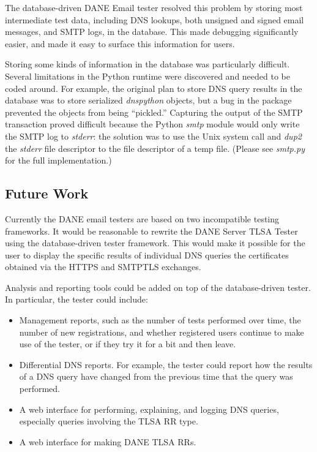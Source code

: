 \documentclass[preprint,3p,11pt]{elsarticle}
\begin{document}
The database-driven DANE Email tester resolved this problem by storing
most intermediate test data, including DNS lookups, both unsigned and
signed email messages, and SMTP logs, in the database. This made
debugging significantly easier, and made it easy to surface this
information for users. 

Storing some kinds of information in the
database was particularly difficult. Several limitations in the Python
runtime were discovered and needed to be coded around. For example,
the original plan to store DNS query results in the database was to
store serialized \emph{dnspython} objects, but a bug in the package prevented
the objects from being ``pickled.'' Capturing the output of the SMTP
transaction proved difficult because the Python \emph{smtp} module
would only write the SMTP log to \emph{stderr}: the solution was to
use the Unix system call and \emph{dup2} the \emph{stderr} file
descriptor to the file descriptor of a temp file. (Please see
\emph{smtp.py} for the full implementation.)

\subsection{Future Work}

Currently the DANE email testers are based on two incompatible testing
frameworks. It would be reasonable to rewrite the DANE Server TLSA
Tester using the database-driven tester framework. This would make it
possible for the user to display the specific results of individual
DNS queries the certificates obtained via the HTTPS and SMTPTLS
exchanges. 

Analysis and reporting tools could be added on top of the
database-driven tester. In particular, the tester could include:
\begin{itemize}
\item Management reports, such as the number of tests performed over
  time, the number of new registrations, and whether registered users continue to
  make use of the tester, or if they try it for a bit and then leave.
\item Differential DNS reports. For example, the tester could report
  how the results of a DNS query have changed from the previous time
  that the query was performed.
\item A web interface for performing, explaining, and logging DNS queries,
  especially queries involving the TLSA RR type.
\item A web interface for making DANE TLSA RRs.
\end{itemize}
\end{document}
